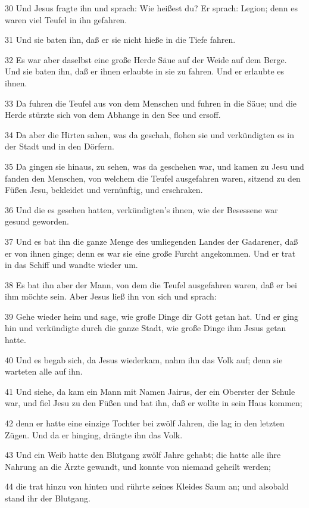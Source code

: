 \par 30 Und Jesus fragte ihn und sprach: Wie heißest du? Er sprach: Legion; denn es waren viel Teufel in ihn gefahren.
\par 31 Und sie baten ihn, daß er sie nicht hieße in die Tiefe fahren.
\par 32 Es war aber daselbst eine große Herde Säue auf der Weide auf dem Berge. Und sie baten ihn, daß er ihnen erlaubte in sie zu fahren. Und er erlaubte es ihnen.
\par 33 Da fuhren die Teufel aus von dem Menschen und fuhren in die Säue; und die Herde stürzte sich von dem Abhange in den See und ersoff.
\par 34 Da aber die Hirten sahen, was da geschah, flohen sie und verkündigten es in der Stadt und in den Dörfern.
\par 35 Da gingen sie hinaus, zu sehen, was da geschehen war, und kamen zu Jesu und fanden den Menschen, von welchem die Teufel ausgefahren waren, sitzend zu den Füßen Jesu, bekleidet und vernünftig, und erschraken.
\par 36 Und die es gesehen hatten, verkündigten's ihnen, wie der Besessene war gesund geworden.
\par 37 Und es bat ihn die ganze Menge des umliegenden Landes der Gadarener, daß er von ihnen ginge; denn es war sie eine große Furcht angekommen. Und er trat in das Schiff und wandte wieder um.
\par 38 Es bat ihn aber der Mann, von dem die Teufel ausgefahren waren, daß er bei ihm möchte sein. Aber Jesus ließ ihn von sich und sprach:
\par 39 Gehe wieder heim und sage, wie große Dinge dir Gott getan hat. Und er ging hin und verkündigte durch die ganze Stadt, wie große Dinge ihm Jesus getan hatte.
\par 40 Und es begab sich, da Jesus wiederkam, nahm ihn das Volk auf; denn sie warteten alle auf ihn.
\par 41 Und siehe, da kam ein Mann mit Namen Jairus, der ein Oberster der Schule war, und fiel Jesu zu den Füßen und bat ihn, daß er wollte in sein Haus kommen;
\par 42 denn er hatte eine einzige Tochter bei zwölf Jahren, die lag in den letzten Zügen. Und da er hinging, drängte ihn das Volk.
\par 43 Und ein Weib hatte den Blutgang zwölf Jahre gehabt; die hatte alle ihre Nahrung an die Ärzte gewandt, und konnte von niemand geheilt werden;
\par 44 die trat hinzu von hinten und rührte seines Kleides Saum an; und alsobald stand ihr der Blutgang.
